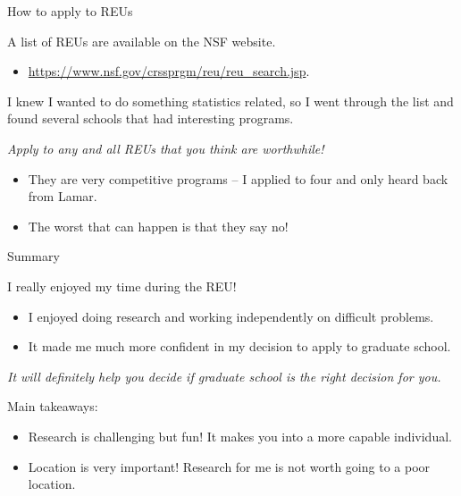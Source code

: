 \documentclass[8pt]{beamer}
\newcommand{\mys}{\vspace{0.5cm} \pause
}
\begin{document}
\begin{frame}{How to apply to REUs}

A list of REUs are available on the NSF website.
\begin{itemize}
    \item \url{https://www.nsf.gov/crssprgm/reu/reu_search.jsp}.
\end{itemize} \mys

I knew I wanted to do something statistics related, so I went through the list and found several schools that had interesting programs. \mys

\textit{Apply to any and all REUs that you think are worthwhile!}
\begin{itemize}
    \item They are very competitive programs -- I applied to four and only heard back from Lamar.
    \item The worst that can happen is that they say no!
\end{itemize}
    
\end{frame}

\begin{frame}{Summary}

I really enjoyed my time during the REU!
\begin{itemize}
    \item I enjoyed doing research and working independently on difficult problems.
    \item It made me much more confident in my decision to apply to graduate school.
\end{itemize} \mys

\textit{It will definitely help you decide if graduate school is the right decision for you.} \mys

Main takeaways:
\begin{itemize}
    \item Research is challenging but fun! It makes you into a more capable individual.
    \item Location is very important! Research for me is not worth going to a poor location.
\end{itemize}
    
\end{frame}
\end{document}
